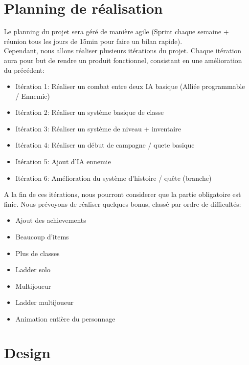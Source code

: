 \documentclass[16pt, oneside]{report}
\begin{document}
\chapter{Planning de r\'ealisation}
Le planning du projet sera g\'er\'e de mani\`ere agile (Sprint chaque semaine + r\'eunion tous les jours de 15min pour faire un bilan rapide).\\
Cependant, nous allons r\'ealiser plusieurs it\'erations du projet. Chaque it\'eration aura pour but de rendre un produit fonctionnel, consistant en une am\'elioration du pr\'ec\'edent:
\begin{itemize}
	\item It\'eration 1: R\'ealiser un combat entre deux IA basique (Alli\'ee programmable / Ennemie)
	\item It\'eration 2: R\'ealiser un syst\`eme basique de classe 
	\item It\'eration 3: R\'ealiser un syst\`eme de niveau + inventaire
	\item It\'eration 4: R\'ealiser un d\'ebut de campagne / quete basique
	\item It\'eration 5: Ajout d'IA ennemie
	\item It\'eration 6: Am\'elioration du syst\`eme d'histoire / qu\^ete (branche)\\

\end{itemize}
A la fin de ces it\'erations, nous pourront considerer que la partie obligatoire est finie. Nous pr\'evoyons de r\'ealiser quelques bonus, class\'e par ordre de difficult\'es:\begin{itemize}
	\item Ajout des achievements
	\item Beaucoup d'items
	\item Plus de classes
	\item Ladder solo
	\item Multijoueur
	\item Ladder multijoueur
	\item Animation enti\`ere du personnage
\end{itemize}

\chapter{Design}
\end{document}
